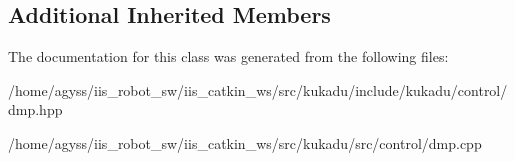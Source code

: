 \subsection*{Additional Inherited Members}


The documentation for this class was generated from the following files\+:\begin{DoxyCompactItemize}
\item 
/home/agyss/iis\+\_\+robot\+\_\+sw/iis\+\_\+catkin\+\_\+ws/src/kukadu/include/kukadu/control/dmp.\+hpp\item 
/home/agyss/iis\+\_\+robot\+\_\+sw/iis\+\_\+catkin\+\_\+ws/src/kukadu/src/control/dmp.\+cpp\end{DoxyCompactItemize}
